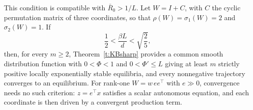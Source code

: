 This condition is compatible with $\bar R_0>1/L$. Let $W=I+C$, with $C$ the cyclic permutation matrix
of three coordinates, so that $\rho(W)=\sigma_1(W)=2$ and $\sigma_2(W)=1$. If
\[
 \frac12<\frac{\beta L}d<\sqrt{\frac25},
\]
then, for every $m\ge2$, Theorem~\ref{t:KBsharp} provides a common smooth distribution function
with $0<\Phi<1$ and $0<\Phi'\le L$ giving at least $m$ strictly positive locally exponentially stable
equilibria, and every nonnegative trajectory converges to an equilibrium. For rank-one
$W=w\,ee^\top$ with $e\gg0$, convergence needs no such criterion: $z=e^\top x$ satisfies a scalar
autonomous equation, and each coordinate is then driven by a convergent production term.

